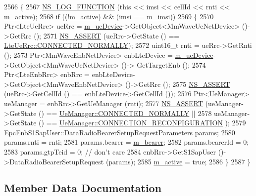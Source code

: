 \begin{DoxyCode}
2566 \{
2567   \hyperlink{log-macros-disabled_8h_a90b90d5bad1f39cb1b64923ea94c0761}{NS\_LOG\_FUNCTION} (\textcolor{keyword}{this} << imsi << cellId << rnti << \hyperlink{classns3_1_1MmWaveDrbActivator_a2b02d9ef64fb9fc16db808a6667bab4b}{m\_active});
2568   \textcolor{keywordflow}{if} ((!\hyperlink{classns3_1_1MmWaveDrbActivator_a2b02d9ef64fb9fc16db808a6667bab4b}{m\_active}) && (imsi == \hyperlink{classns3_1_1MmWaveDrbActivator_aebc672ea56bcc8c4fb28ec64e4d19ac1}{m\_imsi}))
2569     \{
2570       Ptr<LteUeRrc> ueRrc = \hyperlink{classns3_1_1MmWaveDrbActivator_a3685adbe2aad9296a29a7d1fbf42546d}{m\_ueDevice}->GetObject<MmWaveUeNetDevice> ()->GetRrc ();
2571       \hyperlink{assert_8h_a6dccdb0de9b252f60088ce281c49d052}{NS\_ASSERT} (ueRrc->GetState () == \hyperlink{classns3_1_1LteUeRrc_a241012c291e75681150c9214e11f6145a29dc4c52bd374f1b78508fb725de9999}{LteUeRrc::CONNECTED\_NORMALLY});
2572       uint16\_t rnti = ueRrc->GetRnti ();
2573       Ptr<MmWaveEnbNetDevice> enbLteDevice = \hyperlink{classns3_1_1MmWaveDrbActivator_a3685adbe2aad9296a29a7d1fbf42546d}{m\_ueDevice}->GetObject<MmWaveUeNetDevice> ()->
      GetTargetEnb ();
2574       Ptr<LteEnbRrc> enbRrc = enbLteDevice->GetObject<MmWaveEnbNetDevice> ()->GetRrc ();
2575       \hyperlink{assert_8h_a6dccdb0de9b252f60088ce281c49d052}{NS\_ASSERT} (ueRrc->GetCellId () == enbLteDevice->GetCellId ());
2576       Ptr<UeManager> ueManager = enbRrc->GetUeManager (rnti);
2577       \hyperlink{assert_8h_a6dccdb0de9b252f60088ce281c49d052}{NS\_ASSERT} (ueManager->GetState () == 
      \hyperlink{classns3_1_1UeManager_a2f4085fdd18d7125c27da44a5b8b6808a2a1020dce30f19aa9354ba34b2e7c5e0}{UeManager::CONNECTED\_NORMALLY} ||
2578                  ueManager->GetState () == \hyperlink{classns3_1_1UeManager_a2f4085fdd18d7125c27da44a5b8b6808abd13cee86acc2cb3c04241dec919c73f}{UeManager::CONNECTION\_RECONFIGURATION}
      );
2579       EpcEnbS1SapUser::DataRadioBearerSetupRequestParameters params;
2580       params.rnti = rnti;
2581       params.bearer = \hyperlink{classns3_1_1MmWaveDrbActivator_a7bc0456aed6a35aa66b25514ec6ca4e6}{m\_bearer};
2582       params.bearerId = 0;
2583       params.gtpTeid = 0; \textcolor{comment}{// don't care}
2584       enbRrc->GetS1SapUser ()->DataRadioBearerSetupRequest (params);
2585       \hyperlink{classns3_1_1MmWaveDrbActivator_a2b02d9ef64fb9fc16db808a6667bab4b}{m\_active} = \textcolor{keyword}{true};
2586     \}
2587 \}
\end{DoxyCode}


\subsection{Member Data Documentation}

